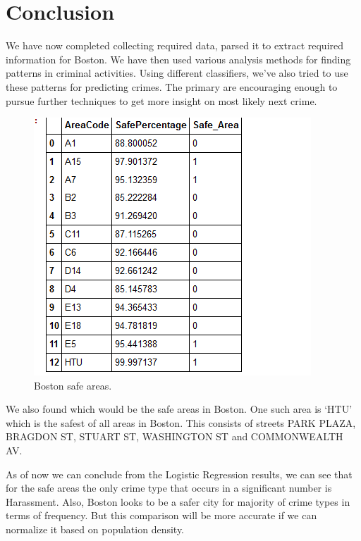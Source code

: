 \documentclass[journal, a4paper]{IEEEtran}
\begin{document}
\section{Conclusion}
    We have now completed collecting required data, parsed it to extract required information for Boston. We have then used various analysis methods for finding patterns in criminal activities. Using different classifiers, we've also tried to use these patterns for predicting crimes. The primary are encouraging enough to pursue further techniques to get more insight on most likely next crime.
    \begin{figure}[!hbt]
        \begin{center}
        \includegraphics[width=\columnwidth]{boston-safe-area.png}
        \caption{Boston safe areas.}
        \label{fig:tf_plot}
        \end{center}
    \end{figure}
We also found which would be the safe areas in Boston. One such area is `HTU’ which is the safest of all areas in Boston. This consists of streets PARK PLAZA, BRAGDON ST, STUART ST, WASHINGTON ST and COMMONWEALTH AV.

As of now we can conclude from the Logistic Regression results, we can see that for the safe areas the only crime type that occurs in a significant number is Harassment. Also, Boston looks to be a safer city for majority of crime types in terms of frequency. But this comparison will be more accurate if we can normalize it based on population density.
\end{document}
